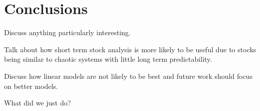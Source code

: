 \documentclass[paper=a4, fontsize=11pt]{scrartcl} %
\numberwithin{equation}{section} %
\numberwithin{figure}{section} %
\numberwithin{table}{section} %
\begin{document}
\section{Conclusions}

Discuss anything particularly interesting. 

Talk about how short term stock analysis is more likely to be useful due to stocks being similar to chaotic systems with little long term predictability. 

Discuss how linear models are not likely to be best and future work should focus on better models. 

What did we just do?




\end{document}

